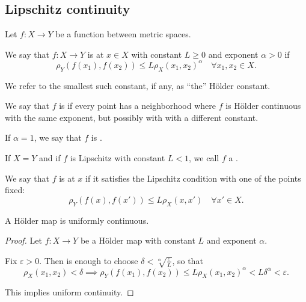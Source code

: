 \subsection{Lipschitz continuity}\label{subsec:lipschitz_continuity}

\begin{definition}\label{def:lipschitz_continuity}
  Let \( f: X \to Y \) be a function between metric spaces.

  \begin{thmenum}
     We say that \( f: X \to Y \) is  at \( x \in X \) with constant \( L \geq 0 \) and exponent \( \alpha > 0 \) if
    \begin{equation*}
      \rho_Y(f(x_1), f(x_2)) \leq L \rho_X(x_1, x_2)^\alpha \quad\forall x_1, x_2 \in X.
    \end{equation*}

    We refer to the smallest such constant, if any, as \enquote{the} H\"older constant.

     We say that \( f \) is  if every point has a neighborhood where \( f \) is H\"older continuous with the same exponent, but possibly with with a different constant.

     If \( \alpha = 1 \), we say that \( f \) is .

     If \( X = Y \) and if \( f \) is Lipschitz with constant \( L < 1 \), we call \( f \) a .

     We say that \( f \) is  at \( x \) if it satisfies the Lipschitz condition with one of the points fixed:
    \begin{equation*}
      \rho_Y(f(x), f(x')) \leq L \rho_X(x, x') \quad\forall x' \in X.
    \end{equation*}
  \end{thmenum}
\end{definition}

\begin{proposition}\label{thm:holder_map_is_uniformly_continuous}
  A H\"older map is uniformly continuous.
\end{proposition}
\begin{proof}
  Let \( f: X \to Y \) be a H\"older map with constant \( L \) and exponent \( \alpha \).

  Fix \( \varepsilon > 0 \). Then is enough to choose \( \delta < \sqrt[\alpha]{\frac \varepsilon L} \), so that
  \begin{equation*}
    \rho_X(x_1, x_2) < \delta \implies \rho_Y(f(x_1), f(x_2)) \leq L \rho_X(x_1, x_2)^\alpha < L \delta^\alpha < \varepsilon.
  \end{equation*}

  This implies uniform continuity.
\end{proof}

